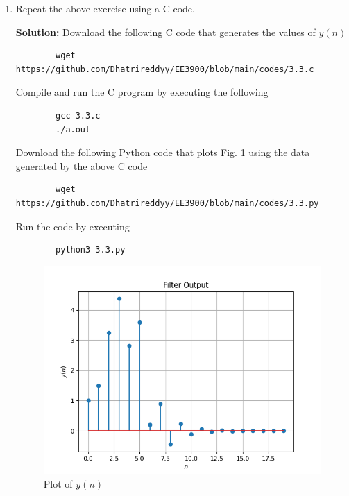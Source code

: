 \documentclass[journal,12pt,twocolumn]{IEEEtran}
\newcommand{\solution}{\noindent \textbf{Solution: }}
\numberwithin{equation}{section}
\renewcommand\thesection{\arabic{section}}
\begin{document}
\begin{enumerate}[label=\thesection.\arabic*,ref=\thesection.\theenumi]
	\item Repeat the above exercise using a C code.
	
	\solution Download the following C code that generates the values of $y(n)$
	\begin{lstlisting}
		wget https://github.com/Dhatrireddyy/EE3900/blob/main/codes/3.3.c
	\end{lstlisting}
	
	Compile and run the C program by executing the following
	\begin{lstlisting}
		gcc 3.3.c
		./a.out
	\end{lstlisting}
	
	Download the following Python code that plots Fig. \ref{fig-3.3} using the data generated by the above C code
	\begin{lstlisting}
		wget https://github.com/Dhatrireddyy/EE3900/blob/main/codes/3.3.py
	\end{lstlisting}
	
	Run the code by executing
	\begin{lstlisting}
		python3 3.3.py
	\end{lstlisting}

	\begin{figure}[!ht]
		\centering
		\includegraphics[width=\columnwidth]{figs/3.3.png}
		\caption{Plot of $y(n)$}
		\label{fig-3.3}	
	\end{figure}
	
	\end{enumerate}
	
\end{document}
